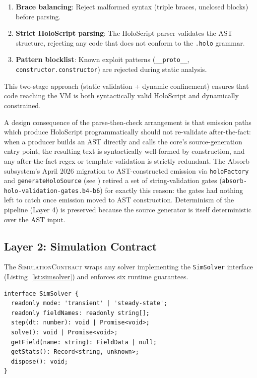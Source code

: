 \documentclass[letterpaper,twocolumn,10pt]{article}
\newcommand{\holoscript}{HoloScript}
\newcommand{\simcontract}{\textsc{SimulationContract}}
\begin{document}
\begin{enumerate}[leftmargin=*,topsep=2pt,itemsep=1pt]
  \item \textbf{Brace balancing}: Reject malformed syntax (triple
    braces, unclosed blocks) before parsing.
  \item \textbf{Strict HoloScript parsing}: The \holoscript{} parser
    validates the AST structure, rejecting any code that does not
    conform to the \texttt{.holo} grammar.
  \item \textbf{Pattern blocklist}: Known exploit patterns
    (\texttt{\_\_proto\_\_}, \texttt{constructor.constructor}) are
    rejected during static analysis.
\end{enumerate}

This two-stage approach (static validation + dynamic confinement)
ensures that code reaching the VM is both syntactically valid
\holoscript{} and dynamically constrained.

A design consequence of the parse-then-check arrangement is that
emission paths which produce \holoscript{} programmatically should
not re-validate after-the-fact: when a producer builds an AST
directly and calls the core's source-generation entry point, the
resulting text is syntactically well-formed by construction, and
any after-the-fact regex or template validation is strictly
redundant. The Absorb subsystem's April 2026 migration to
AST-constructed emission via \texttt{holoFactory} and
\texttt{generateHoloSource} (see \cite{absorb-b1-b2-2026})
retired a set of string-validation gates
(\texttt{absorb-holo-validation-gates.b4-b6}) for exactly this
reason: the gates had nothing left to catch once emission moved
to AST construction. Determinism of the pipeline (Layer 4) is
preserved because the source generator is itself deterministic
over the AST input.

\subsection{Layer 2: Simulation Contract}

The \simcontract{} wraps any solver implementing the \texttt{SimSolver}
interface (Listing~\ref{lst:simsolver}) and enforces six runtime
guarantees.

\begin{lstlisting}[caption={The \texttt{SimSolver} interface. Any domain solver (structural, thermal, CFD) implements this interface and is wrapped by \simcontract{}.}, label={lst:simsolver}, float=t]
interface SimSolver {
  readonly mode: 'transient' | 'steady-state';
  readonly fieldNames: readonly string[];
  step(dt: number): void | Promise<void>;
  solve(): void | Promise<void>;
  getField(name: string): FieldData | null;
  getStats(): Record<string, unknown>;
  dispose(): void;
}
\end{lstlisting}
\end{document}
